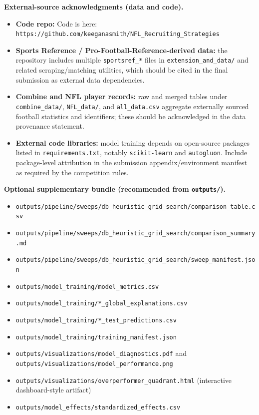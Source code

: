 \textbf{External-source acknowledgments (data and code).}
\begin{itemize}
  \item \textbf{Code repo:} Code is here: \verb|https://github.com/keeganasmith/NFL_Recruiting_Strategies|
  \item \textbf{Sports Reference / Pro-Football-Reference-derived data:} the repository includes multiple \texttt{sportsref\_*} files in \texttt{extension\_and\_data/} and related scraping/matching utilities, which should be cited in the final submission as external data dependencies.
  \item \textbf{Combine and NFL player records:} raw and merged tables under \texttt{combine\_data/}, \texttt{NFL\_data/}, and \texttt{all\_data.csv} aggregate externally sourced football statistics and identifiers; these should be acknowledged in the data provenance statement.
  \item \textbf{External code libraries:} model training depends on open-source packages listed in \texttt{requirements.txt}, notably \texttt{scikit-learn} and \texttt{autogluon}. Include package-level attribution in the submission appendix/environment manifest as required by the competition rules.
\end{itemize}

\textbf{Optional supplementary bundle (recommended from \texttt{outputs/}).}
\begin{itemize}
  \item \texttt{outputs/pipeline/sweeps/db\_heuristic\_grid\_search/comparison\_table.csv}
  \item \texttt{outputs/pipeline/sweeps/db\_heuristic\_grid\_search/comparison\_summary.md}
  \item \texttt{outputs/pipeline/sweeps/db\_heuristic\_grid\_search/sweep\_manifest.json}
  \item \texttt{outputs/model\_training/model\_metrics.csv}
  \item \texttt{outputs/model\_training/*\_global\_explanations.csv}
  \item \texttt{outputs/model\_training/*\_test\_predictions.csv}
  \item \texttt{outputs/model\_training/training\_manifest.json}
  \item \texttt{outputs/visualizations/model\_diagnostics.pdf} and \texttt{outputs/visualizations/model\_performance.png}
  \item \texttt{outputs/visualizations/overperformer\_quadrant.html} (interactive dashboard-style artifact)
  \item \texttt{outputs/model\_effects/standardized\_effects.csv}
\end{itemize}
